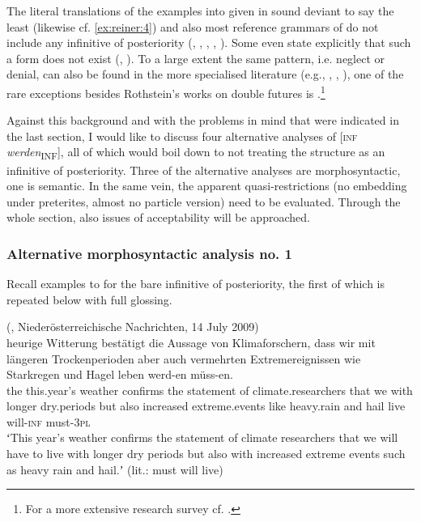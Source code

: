 \documentclass[output=paper,hidelinks]{langscibook}
\begin{document}
The literal translations of the  examples into  given in  sound deviant to say the least (likewise cf. \ref{ex:reiner:4}) and also most reference grammars of  do not include any infinitive of posteriority (\citealt[567]{HeidolphWurzel1981}, \citealt[1686]{ZifonunStrecker1997}, \citealt[95–96]{HelbigBuscha2001}, \citealt[192]{Eisenberg2013a}, \citealt[487]{Wöllstein2016}). Some even state explicitly that such a form does not exist (\citealt[122]{Erben1980}, \citealt[128]{HentschelWeydt2013}). To a large extent the same pattern, i.e. neglect or denial, can also be found in the more specialised literature (e.g., \citealt[95]{Bech1983},  \citealt[148]{Fabricius-Hansen1986}, \citealt{Heine1995}), one of the rare exceptions besides Rothstein’s works on double futures is \citet[116]{Abraham2004}.\footnote{For a more extensive research survey cf. \citet{Reiner2018}.} 


Against this background and with the problems in mind that were indicated in the last section, I would like to discuss four alternative analyses of [\textsc{inf} \textit{werden}\textsubscript{INF}], all of which would boil down to not treating the structure as an infinitive of posteriority. Three of the alternative analyses are morphosyntactic, one is semantic. In the same vein, the apparent quasi-restrictions (no embedding under preterites, almost no particle version) need to be evaluated. Through the whole section, also issues of acceptability will be approached.

\subsubsection{Alternative morphosyntactic analysis no. 1}
Recall examples  to  for the bare infinitive of posteriority, the first of which is repeated below with full glossing.

\ea\label{ex:reiner:33}  (, Niederösterreichische Nachrichten, 14 July 2009) \\
	{heurige}	{Witterung}	{bestätigt}   {die}	{Aussage}	{von}	{Klimaforschern,} {dass}	{wir}	{mit}	{längeren}	{Trockenperioden} {aber}	{auch}	{vermehrten}	{Extremereignissen}   {wie}	{Starkregen}	{und}	{Hagel}   {leben}	{werd-en}	{müss-en.}\\
the	this.year’s	weather	confirms    the 	statement	of	climate.researchers that	we	with	longer		dry.periods but	also	increased	extreme.events  like	heavy.rain	and	hail    live	will-\textsc{inf}	must-\textsc{3pl}\\
\glt ʻThis year’s weather confirms the statement of climate researchers that we will have to live with longer dry periods but also with increased extreme events such as heavy rain and hail.ʼ (lit.: must will live)
\z 
\end{document}
